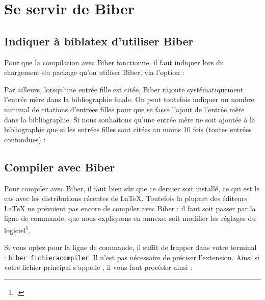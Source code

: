 \section{Se servir de Biber}

\subsection{Indiquer à biblatex d'utiliser Biber}

Pour que la compilation avec Biber fonctionne, il faut indiquer lors du chargement du package qu'on utiliser Biber, via l'option  :

\begin{latexcode}
\usepackage[backend=biber,...]{biblatex}
\end{latexcode}

Par ailleurs, lorsqu'une entrée fille est citée, Biber rajoute systématiquement l'entrée mère dans la bibliographie finale. On peut toutefois indiquer un nombre minimal de citations d'entrées filles pour que se fasse l'ajout de l'entrée mère dans la bibliographie. Si nous souhaitons qu'une entrée mère ne soit ajoutée à la bibliographie que si les entrées filles sont citées au moins 10 fois (toutes entrées confondues) :


\begin{latexcode}
\usepackage[backend=biber,mincrossrefs=10,…]{biblatex}
\end{latexcode}



\subsection{Compiler avec Biber}

Pour compiler avec Biber, il faut bien sûr que ce dernier soit installé, ce qui est le cas avec les distributions récentes de \LaTeX. Toutefois la plupart des éditeurs \LaTeX{} ne prévoient pas encore de compiler avec Biber : il faut soit passer par la ligne de commande, que nous expliquons en annexe, soit modifier les réglages du logiciel\footcite[On peut trouver comment faire pour quelques logiciels à cette adresse][]{biber_logiciels}.

Si vous optez pour la ligne de commande, il suffit de frapper dans votre terminal : \verb|biber fichieracompiler|. Il n'est pas nécessaire de préciser l'extension. Ainsi si votre fichier  principal s'appelle , il vous faut procéder ainsi :

